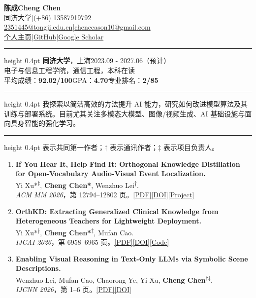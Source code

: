 \documentclass[10pt]{article}
\newcommand{\cvsection}[2][4]{\par\addvspace{11pt}\Needspace{#1\baselineskip}{\fontsize{13}{15.5}\selectfont\bfseries #2\par}\nobreak\vspace{2pt}\hrule height 0.4pt\nobreak\vspace{5pt}}
\begin{document}
\fontsize{10.5}{13}\selectfont
\begin{center}
{\fontsize{21}{24}\selectfont\bfseries 陈成\quad Cheng Chen}\\[5pt]
同济大学\quad |\quad (+86) 13587919792\\[2pt]
\href{mailto:2351445@tongji.edu.cn}{2351445@tongji.edu.cn}\quad |\quad \href{mailto:chenceason10@gmail.com}{chenceason10@gmail.com}\\[2pt]
\href{https://ceasonen.github.io}{个人主页}\quad |\quad \href{https://github.com/ceasonen}{GitHub}\quad |\quad \href{https://scholar.google.com/citations?user=X92zQ68AAAAJ}{Google Scholar}
\end{center}

\cvsection{教育背景}
\textbf{同济大学}，上海\hfill 2023.09 - 2027.06（预计）\\
电子与信息工程学院，通信工程，本科在读\\
平均成绩：\textbf{92.02/100}\quad GPA：\textbf{4.70}\quad 专业排名：\textbf{2/85}

\cvsection{Main interests}
我探索以简洁高效的方法提升 AI 能力，研究如何改进模型算法及其训练与部署系统。目前尤其关注多模态大模型、图像/视频生成、AI 基础设施与面向具身智能的强化学习。

\cvsection{已录用论文}
{\small * 表示共同第一作者；† 表示通讯作者；‡ 表示项目负责人。}
\begin{enumerate}
\raggedright
\item \textbf{If You Hear It, Help Find It: Orthogonal Knowledge Distillation for Open-Vocabulary Audio-Visual Event Localization.}\\
Yi Xu*\textsuperscript{‡}, \textbf{Cheng Chen*}, Wenzhuo Lei\textsuperscript{†}.\\
\textit{ACM MM 2026}，第 12794--12802 页。\quad \href{https://arxiv.org/pdf/2609.23376}{[PDF]}\quad \href{https://doi.org/10.1145/3767308.3835302}{[DOI]}\quad \href{https://github.com/ScottBlizzard/OV-OrthKD}{[Project]}
\item \textbf{OrthKD: Extracting Generalized Clinical Knowledge from Heterogeneous Teachers for Lightweight Deployment.}\\
Yi Xu*\textsuperscript{†}, \textbf{Cheng Chen*}\textsuperscript{‡}, Mufan Cao.\\
\textit{IJCAI 2026}，第 6958--6965 页。\quad \href{https://arxiv.org/pdf/2607.25545v1}{[PDF]}\quad \href{https://doi.org/10.24963/ijcai.2026/774}{[DOI]}\quad \href{https://github.com/ScottBlizzard/orthkd-dr-screening}{[Code]}
\item \textbf{Enabling Visual Reasoning in Text-Only LLMs via Symbolic Scene Descriptions.}\\
Wenzhuo Lei, Mufan Cao, Chaorong Ye, Yi Xu, \textbf{Cheng Chen}\textsuperscript{†‡}.\\
\textit{IJCNN 2026}，第 1--6 页。\quad \href{https://ceasonen.github.io/assets/papers/deepyolo-ijcnn-2026.pdf}{[PDF]}\quad \href{https://doi.org/10.1109/IJCNN69854.2026.11729294}{[DOI]}
\end{enumerate}
\end{document}
